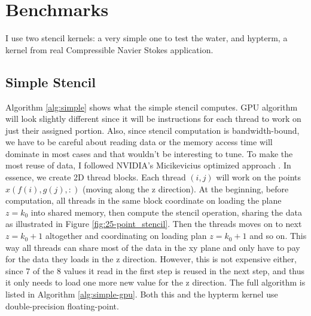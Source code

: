 \section{Benchmarks}
I use two stencil kernels: a very simple one to test the water, and hypterm, a kernel from real Compressible Navier Stokes application.

\subsection{Simple Stencil}
Algorithm \ref{alg:simple} shows what the simple stencil computes. GPU algorithm will look slightly different since it will be instructions for each thread to work on just their assigned portion. Also, since stencil computation is bandwidth-bound, we have to be careful about reading data or the memory access time will dominate in most cases and that wouldn't be interesting to tune.
To make the most reuse of data, I followed NVIDIA's Micikevicius optimized approach \cite{nvidia_25p-stencil}. In essence, we create 2D thread blocks. Each thread $(i,j)$ will work on the points $x(f(i),g(j),:)$ (moving along the z direction). At the beginning, before computation, all threads in the same block coordinate on loading the plane $z=k_0$ into shared memory, then compute the stencil operation, sharing the data as illustrated in Figure \ref{fig:25-point_stencil}. Then the threads moves on to next $z=k_0+1$ altogether and coordinating on loading plan $z=k_0+1$ and so on. This way all threads can share most of the data in the xy plane and only have to pay for the data they loads in the z direction. However, this is not expensive either, since 7 of the 8 values it read in the first step is reused in the next step, and thus it only needs to load one more new value for the z direction. The full algorithm is listed in Algorithm \ref{alg:simple-gpu}. Both this and the hypterm kernel use double-precision floating-point.

